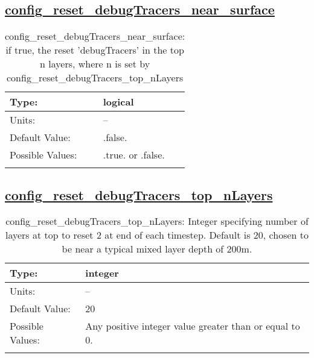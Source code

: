 \subsection[config\_reset\_debugTracers\_near\_surface]{\hyperref[sec:nm_tab_tracer_forcing_debugTracers]{config\_reset\_debugTracers\_near\_surface}}
\label{subsec:nm_sec_config_reset_debugTracers_near_surface}
\begin{center}
\begin{longtable}{| p{2.0in} || p{4.0in} |}
    \hline
    Type: & logical \\
    \hline
    Units: & -- \\
    \hline
    Default Value: & .false. \\
    \hline
    Possible Values: & .true. or .false. \\
    \hline
    \caption{config\_reset\_debugTracers\_near\_surface: if true, the reset 'debugTracers' in the top n layers, where n is set by config\_reset\_debugTracers\_top\_nLayers}
\end{longtable}
\end{center}
\subsection[config\_reset\_debugTracers\_top\_nLayers]{\hyperref[sec:nm_tab_tracer_forcing_debugTracers]{config\_reset\_debugTracers\_top\_nLayers}}
\label{subsec:nm_sec_config_reset_debugTracers_top_nLayers}
\begin{center}
\begin{longtable}{| p{2.0in} || p{4.0in} |}
    \hline
    Type: & integer \\
    \hline
    Units: & -- \\
    \hline
    Default Value: & 20 \\
    \hline
    Possible Values: & Any positive integer value greater than or equal to 0. \\
    \hline
    \caption{config\_reset\_debugTracers\_top\_nLayers: Integer specifying number of layers at top to reset 2 at end of each timestep. Default is 20, chosen to be near a typical mixed layer depth of 200m.}
\end{longtable}
\end{center}
